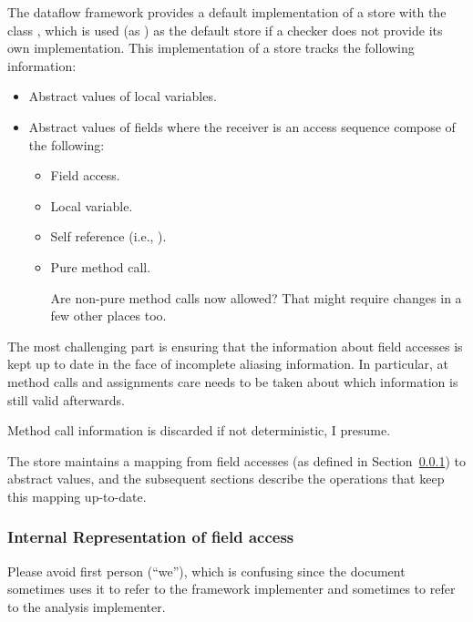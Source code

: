 The dataflow framework provides a default implementation of a store with the
class , which is used (as ) as the
default store if a checker does not provide its own implementation.
This implementation of a store tracks the following information:
\begin{itemize}
	\item Abstract values of local variables.
	\item Abstract values of fields where the receiver is an access sequence
	compose of the following:
	\begin{itemize}
	\item Field access.
	\item Local variable.
	\item Self reference (i.e., ).
	\item Pure method call.
\begin{workinprogress}
Are non-pure method calls now allowed?  That might require changes in a few
other places too.
\end{workinprogress}
	\end{itemize}
\end{itemize}

The most challenging part is ensuring that the information about
field accesses is kept up to date in the face of incomplete aliasing
information.  In particular, at method calls and assignments care needs to be
taken about which information is still valid afterwards.

\begin{workinprogress}
Method call information is discarded if not deterministic, I presume.
\end{workinprogress}

The store maintains a mapping from field accesses (as defined in Section~\ref{sec:field-access}) to
abstract values, and the subsequent sections describe the operations that
keep this mapping up-to-date.


\subsubsection{Internal Representation of field access}
\label{sec:field-access}

\begin{workinprogress}
Please avoid first person (``we''), which is confusing since the document
sometimes uses it to refer to the framework implementer and sometimes to
refer to the analysis implementer.
\end{workinprogress}


